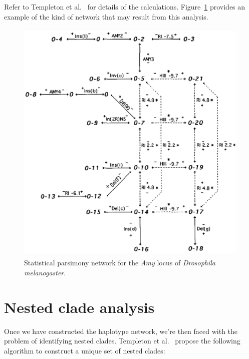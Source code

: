 \noindent Refer to Templeton et al.~\cite{Templeton-etal-1992} for
details of the calculations. Figure~\ref{fig:amy-tcs} provides an
example of the kind of network that may result from this
analysis.

\begin{figure}
\begin{center}
\includegraphics[height=12cm]{amy-tcs.eps}
\end{center}
\caption{Statistical parsimony network for the {\it Amy\/} locus of
  {\it Drosophila melanogaster}.}\label{fig:amy-tcs}
\end{figure}

\section*{Nested clade analysis}

Once we have constructed the haplotype network, we're then faced with
the problem of identifying nested clades. Templeton et
al.~\cite{Templeton-etal-1987} propose the following algorithm to
construct a unique set of nested clades:

